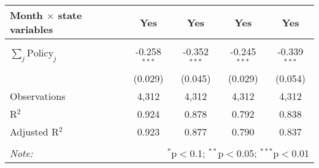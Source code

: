 \begin{tabular}{@{\extracolsep{1pt}}lcccc}
Month $\times$ state variables & Yes & Yes & Yes & Yes \\ 
\hline \\[-1.8ex] 
$\sum_j \mathrm{Policy}_j$ & -0.258$^{***}$ & -0.352$^{***}$ & -0.245$^{***}$ & -0.339$^{***}$ \\ 
 & (0.029) & (0.045) & (0.029) & (0.054) \\ 
Observations & 4,312 & 4,312 & 4,312 & 4,312 \\ 
R$^{2}$ & 0.924 & 0.878 & 0.792 & 0.838 \\ 
Adjusted R$^{2}$ & 0.923 & 0.877 & 0.790 & 0.837 \\ 
\hline 
\hline \\[-1.8ex] 
\textit{Note:}  & \multicolumn{4}{r}{$^{*}$p$<$0.1; $^{**}$p$<$0.05; $^{***}$p$<$0.01} \\ 
\end{tabular} 